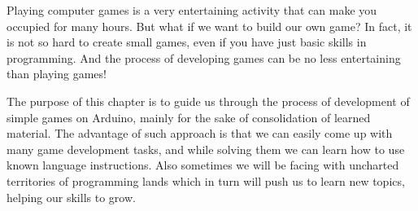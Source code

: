 \documentclass[../sparc.tex]{subfiles}
\begin{document}
Playing computer games is a very entertaining activity that can make you
occupied for many hours.  But what if we want to build our own game?  In fact,
it is not so hard to create small games, even if you have just basic skills in
programming.  And the process of developing games can be no less entertaining
than playing games!

The purpose of this chapter is to guide us through the process of development of
simple games on Arduino, mainly for the sake of consolidation of learned
material.  The advantage of such approach is that we can easily come up with
many game development tasks, and while solving them we can learn how to use
known language instructions.  Also sometimes we will be facing with uncharted
territories of programming lands which in turn will push us to learn new topics,
helping our skills to grow.
\end{document}
